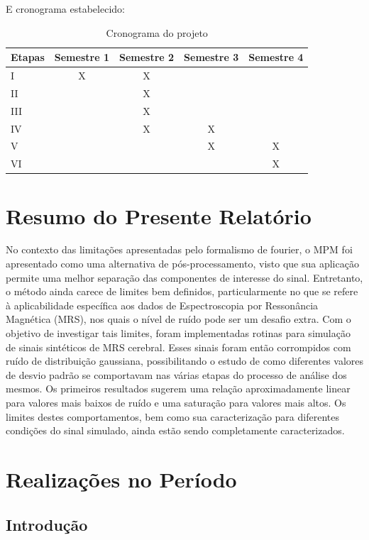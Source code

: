 \documentclass[12pt]{article}
\begin{document}
E cronograma estabelecido:

\begin{table}[H] 
    \centering
    \begin{tabular}{|l|c|c|c|c|}
    \hline
    Etapas & Semestre 1 & Semestre 2 & Semestre 3 & Semestre 4 \\
    \hline
    I & X & X & & \\
    \hline
    II &  & X & & \\
    \hline
    III & & X & & \\
    \hline
    IV & & X & X &\\
    \hline
    V & & & X & X\\
    \hline
    VI & & & & X \\
    \hline
    \end{tabular}
    \caption{Cronograma do projeto}
    \label{table:2}
\end{table}

\section{Resumo do Presente Relatório}
No contexto das limitações apresentadas pelo formalismo de fourier, o MPM foi apresentado como uma 
alternativa de pós-processamento, visto que sua aplicação permite uma melhor separação das componentes 
de interesse do sinal.  Entretanto, o método ainda carece de limites bem definidos, particularmente no 
que se refere à aplicabilidade específica aos dados de Espectroscopia por Ressonância Magnética (MRS), 
nos quais o nível de ruído pode ser um desafio extra. Com o objetivo de investigar tais limites, foram 
implementadas rotinas para simulação de sinais sintéticos de MRS cerebral. Esses sinais foram então 
corrompidos com ruído de distribuição gaussiana, possibilitando o estudo de como diferentes valores de 
desvio padrão se comportavam nas várias etapas do processo de análise dos mesmos. Os primeiros resultados 
sugerem uma relação aproximadamente linear para valores mais baixos de ruído e uma saturação para valores 
mais altos. Os limites destes comportamentos, bem como sua caracterização para diferentes condições do sinal 
simulado, ainda estão sendo completamente caracterizados.


\section{Realizações no Período}
\subsection{Introdução}
\end{document}
